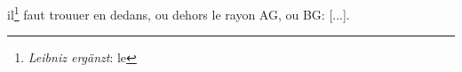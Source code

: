 \pend \pstart [p.~117] [...] il\footnote{\textit{Leibniz erg\"{a}nzt}: le} faut trouuer en dedans, ou dehors le rayon AG, ou BG: [...].